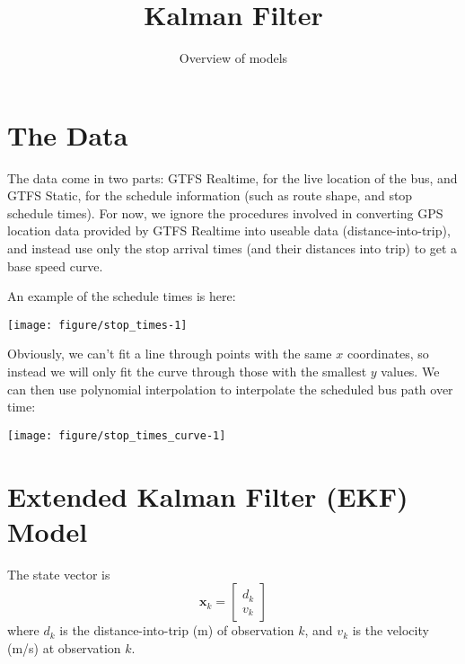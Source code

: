 \documentclass[11pt]{article}\usepackage[]{graphicx}\usepackage[]{color}
\title{Kalman Filter}
\author{Overview of models}
\date{}
\newenvironment{knitrout}{}{} %
\newcommand{\bx}{\boldsymbol{x}}
\begin{document}
\maketitle



\section{The Data}

The data come in two parts: GTFS Realtime, for the live location of the bus, and GTFS
Static, for the schedule information (such as route shape, and stop schedule times).  
For now, we ignore the procedures involved in converting GPS location data provided by 
GTFS Realtime into useable data (distance-into-trip), and instead use only the stop arrival
times (and their distances into trip) to get a base speed curve.

An example of the schedule times is here:
\begin{knitrout}
\color{fgcolor}

{\centering \texttt{[image: figure/stop\_times-1]} 

}



\end{knitrout}

Obviously, we can't fit a line through points with the same $x$ coordinates, so instead we will only fit the curve
through those with the smallest $y$ values.
We can then use polynomial interpolation to interpolate the scheduled bus path over time:
\begin{knitrout}
\color{fgcolor}

{\centering \texttt{[image: figure/stop\_times\_curve-1]} 

}



\end{knitrout}




\section{Extended Kalman Filter (EKF) Model}

The state vector is
\begin{equation}
  \label{eq:state-vector}
  \bx_k =
  \begin{bmatrix}
    d_k \\ v_k
  \end{bmatrix}
\end{equation}
where $d_k$ is the distance-into-trip (m) of observation $k$, and $v_k$ is the velocity (m/s) at
observation $k$.
\end{document}
